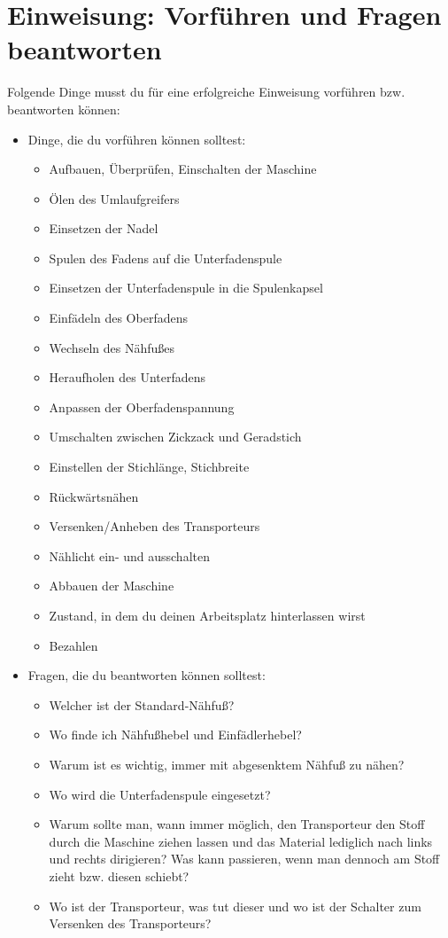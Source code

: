 \documentclass{\basedir/fablab-document}
\begin{document}
\section{Einweisung: Vorführen und Fragen beantworten}
Folgende Dinge musst du für eine erfolgreiche Einweisung vorführen bzw. beantworten können:
\begin{itemize}
	\item Dinge, die du vorführen können solltest:
	\begin{itemize}
		\item Aufbauen, Überprüfen, Einschalten der Maschine
		\item Ölen des Umlaufgreifers
		\item Einsetzen der Nadel
		\item Spulen des Fadens auf die Unterfadenspule
		\item Einsetzen der Unterfadenspule in die Spulenkapsel
		\item Einfädeln des Oberfadens
		\item Wechseln des Nähfußes
		\item Heraufholen des Unterfadens
		\item Anpassen der Oberfadenspannung
		\item Umschalten zwischen Zickzack und Geradstich
		\item Einstellen der Stichlänge, Stichbreite
		\item Rückwärtsnähen
		\item Versenken/Anheben des Transporteurs
		\item Nählicht ein- und ausschalten
		\item Abbauen der Maschine
		\item Zustand, in dem du deinen Arbeitsplatz hinterlassen wirst
		\item Bezahlen
	\end{itemize}

	\item Fragen, die du beantworten können solltest:
	\begin{itemize}
		\item Welcher ist der Standard-Nähfuß?
		\item Wo finde ich Nähfußhebel und Einfädlerhebel?
		\item Warum ist es wichtig, immer mit abgesenktem Nähfuß zu nähen?
		\item Wo wird die Unterfadenspule eingesetzt?
		\item Warum sollte man, wann immer möglich, den Transporteur den Stoff durch die Maschine ziehen lassen und das Material lediglich nach links und rechts dirigieren? Was kann passieren, wenn man dennoch am Stoff zieht bzw. diesen schiebt?
		\item Wo ist der Transporteur, was tut dieser und wo ist der Schalter zum Versenken des Transporteurs?
	\end{itemize}
\end{itemize}


\newpage
{}
\end{document}
